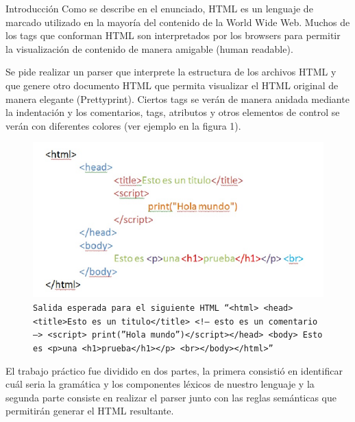 \documentclass[a4paper,8pt]{article}
\begin{document}
\begin{section}{Introducción}
Como se describe en el enunciado, HTML es un lenguaje de marcado utilizado en la mayoría del contenido de la World Wide Web.
Muchos de los tags que conforman HTML son interpretados por los browsers para permitir la visualización de contenido de manera amigable (human readable). 

Se pide realizar un parser que interprete la estructura de los archivos HTML y que genere otro documento HTML que permita visualizar el HTML original de manera elegante (Prettyprint). Ciertos tags se verán de manera anidada mediante la indentación y los comentarios, tags, atributos y otros elementos de control se verán con diferentes colores (ver ejemplo en la figura 1).

\begin{figure}[h!]
  \centering
  \includegraphics[scale=0.70]{salida.png}
  \caption{\texttt{Salida esperada para el siguiente HTML ``$<html> <head><title>$Esto es un titulo$</title> <!–$ esto es un comentario $–> <script> print($”Hola mundo”$)</script></head> <body>$ Esto es $<p>$una $<h1>$prueba$</h1></p> <br></body></html>$''}}
\end{figure}

El trabajo práctico fue dividido en dos partes, la primera consistió en identificar cuál seria la gramática y los componentes léxicos de nuestro lenguaje y la segunda parte consiste en realizar el parser junto con las reglas semánticas que permitirán generar el HTML resultante.
 


\end{section}
\newpage
\end{document}

